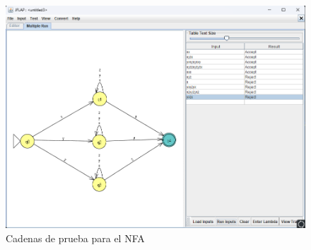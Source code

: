 \documentclass[11pt]{report}
\begin{document}
\begin{figure}[H]
  \centering
  \includegraphics[scale=0.45]{img/NFA_07_test.png}
  \caption{Cadenas de prueba para el NFA}
\end{figure}

\newpage
\end{document}
